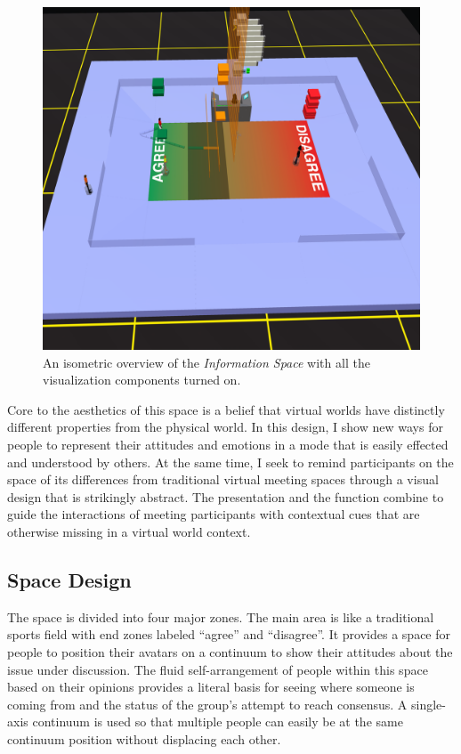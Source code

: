 \begin{figure}[t]
	\includegraphics{figures/information-space-iso-overview.png}
	\caption{An isometric overview of the \emph{Information Space} with all the visualization components turned on.}
	\label{fig:information_space_overview}
\end{figure}

Core to the aesthetics of this space is a belief that virtual worlds have distinctly different properties from the physical world. In this design, I show new ways for people to represent their attitudes and emotions in a mode that is easily effected and understood by others. At the same time, I seek to remind participants on the space of its differences from traditional virtual meeting spaces through a visual design that is strikingly abstract. The presentation and the function combine to guide the interactions of meeting participants with contextual cues that are otherwise missing in a virtual world context.


\subsection{Space Design}

The space is divided into four major zones. The main area is like a traditional sports field with end zones labeled ``agree'' and ``disagree''. It provides a space for people to position their avatars on a continuum to show their attitudes about the issue under discussion. The fluid self-arrangement of people within this space based on their opinions provides a literal basis for seeing where someone is coming from and the status of the group's attempt to reach consensus. A single-axis continuum is used so that multiple people can easily be at the same continuum position without displacing each other.

